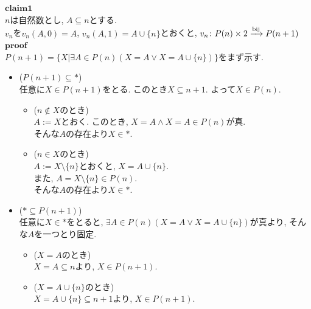   $\mathbf{claim1}$\\
  $n$は自然数とし,
  $A \subseteq n$とする.\\
  $v_n$を$v_n(A,0) = A$,
  $v_n(A,1) = A \cup \{n\}$とおくと,
  $v_n\colon P(n) \times 2 \xrightarrow{\text{bij}} P(n+1)$\\
  $\mathbf{proof}$\\
  $P(n+1) = \{X | \exists A \in P(n)( X = A \lor X = A \cup \{n\})\}$をまず示す.
  \begin{itemize}
    \item[]\hspace{-0.5cm} ($P(n+1) \subseteq *$) \\
      任意に$X \in P(n+1)$をとる.
      このとき$X \subseteq n+1$.
      よって$X \in P(n)$.
      \begin{itemize}
        \item[]\hspace{-0.5cm} ($n \not \in X$のとき) \\
          $A:= X$とおく.
          このとき,
          $X = A \land X = A \in P(n)$が真.\\
          そんな$A$の存在より$X \in *.$
        \item[]\hspace{-0.5cm} ($n \in X$のとき) \\
          $A:= X \setminus \{n\}$とおくと,
          $X = A \cup \{n\}$.\\
          また,
          $A = X \setminus \{n\} \in P(n)$.\\
          そんな$A$の存在より$X \in *.$
      \end{itemize}
    \item[]\hspace{-0.5cm} ($* \subseteq P(n+1)$) \\
      任意に$X \in *$をとると,
      $\exists A \in P(n)( X = A \lor X = A \cup \{n\})$が真より,
      そんな$A$を一つとり固定.
      \begin{itemize}
        \item[]\hspace{-0.5cm} ($X = A$のとき) \\
          $X = A \subseteq n$より,
          $X \in P(n+1)$.
        \item[]\hspace{-0.5cm} ($X = A  \cup \{n\}$のとき) \\
          $X = A  \cup \{n\} \subseteq n+1$より,
          $X \in P(n+1)$.
      \end{itemize}
  \end{itemize}
